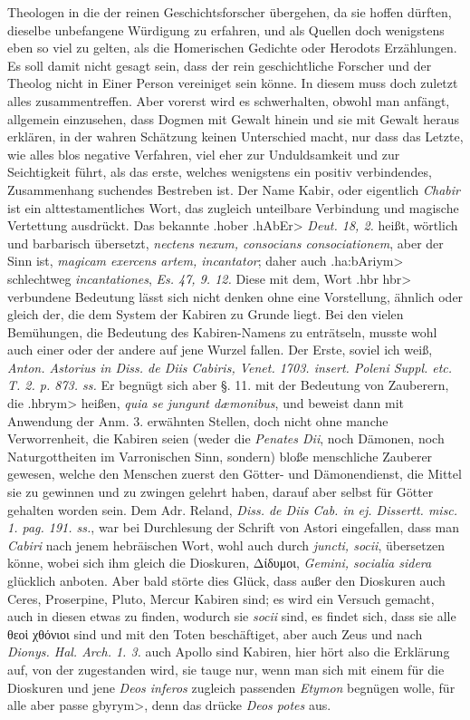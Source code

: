 \documentclass[a4paper, 11pt, oneside]{article}
\begin{document}
Theologen in die der reinen Geschichtsforscher übergehen, da sie hoffen dürften, dieselbe unbefangene Würdigung zu erfahren, und als Quellen doch wenigstens eben so viel zu gelten, als die Homerischen Gedichte oder Herodots Erzählungen. Es soll damit nicht gesagt sein, dass der rein geschichtliche Forscher und der Theolog nicht in Einer Person vereiniget sein könne. In diesem muss doch zuletzt alles zusammentreffen. Aber vorerst wird es schwerhalten, obwohl man anfängt, allgemein einzusehen, dass Dogmen mit Gewalt hinein und sie mit Gewalt heraus erklären, in der wahren Schätzung keinen Unterschied macht, nur dass das Letzte, wie alles blos negative Verfahren, viel eher zur Unduldsamkeit und zur Seichtigkeit führt, als das erste, welches wenigstens ein positiv verbindendes, Zusammenhang suchendes Bestreben ist. Der Name Kabir, oder eigentlich \emph{Chabir} ist ein alttestamentliches Wort, das zugleich unteilbare Verbindung und magische Vertettung ausdrückt. Das bekannte \foreignlanguage{hebrew}{\<.hober .hAbEr>} \emph{Deut. 18, 2.} heißt, wörtlich und barbarisch übersetzt, \emph{nectens nexum, consocians consociationem}, aber der Sinn ist, \emph{magicam exercens artem, incantator}; daher auch \foreignlanguage{hebrew}{\<.ha:bAriym>} schlechtweg \emph{incantationes}, \emph{Es. 47, 9. 12.} Diese mit dem, Wort \foreignlanguage{hebrew}{\<.hbr hbr>} verbundene Bedeutung lässt sich nicht denken ohne eine Vorstellung, ähnlich oder gleich der, die dem System der Kabiren zu Grunde liegt. Bei den vielen Bemühungen, die Bedeutung des Kabiren-Namens zu enträtseln, musste wohl auch einer oder der andere auf jene Wurzel fallen. Der Erste, soviel ich weiß, \emph{Anton. Astorius in Diss. de Diis Cabiris, Venet. 1703. insert. Poleni Suppl. etc. T. 2. p. 873. ss.} Er begnügt sich aber §. 11. mit der Bedeutung von Zauberern, die \foreignlanguage{hebrew}{\<.hbrym>} heißen, \emph{quia se jungunt dæmonibus}, und beweist dann mit Anwendung der Anm. 3. erwähnten Stellen, doch nicht ohne manche Verworrenheit, die Kabiren seien (weder die \emph{Penates Dii}, noch Dämonen, noch Naturgottheiten im Varronischen Sinn, sondern) bloße menschliche Zauberer gewesen, welche den Menschen zuerst den Götter- und Dämonendienst, die Mittel sie zu gewinnen und zu zwingen gelehrt haben, darauf aber selbst für Götter gehalten worden sein. Dem Adr. Reland, \emph{Diss. de Diis Cab. in ej. Dissertt. misc. 1. pag. 191. ss.}, war bei Durchlesung der Schrift von Astori eingefallen, dass man \emph{Cabiri} nach jenem hebräischen Wort, wohl auch durch \emph{juncti, socii}, übersetzen könne, wobei sich ihm gleich die Dioskuren, Δίδυμοι, \emph{Gemini, socialia sidera} glücklich anboten. Aber bald störte dies Glück, dass außer den Dioskuren auch Ceres, Proserpine, Pluto, Mercur Kabiren sind; es wird ein Versuch gemacht, auch in diesen etwas zu finden, wodurch sie \emph{socii} sind, es findet sich, dass sie alle θεοἱ χθόνιοι sind und mit den Toten beschäftiget, aber auch Zeus und nach \emph{Dionys. Hal. Arch. 1. 3.} auch Apollo sind Kabiren, hier hört also die Erklärung auf, von der zugestanden wird, sie tauge nur, wenn man sich mit einem für die Dioskuren und jene \emph{Deos inferos} zugleich passenden \emph{Etymon} begnügen wolle, für alle aber passe \foreignlanguage{hebrew}{\<gbyrym>}, denn das drücke \emph{Deos potes} aus. 
\end{document}
